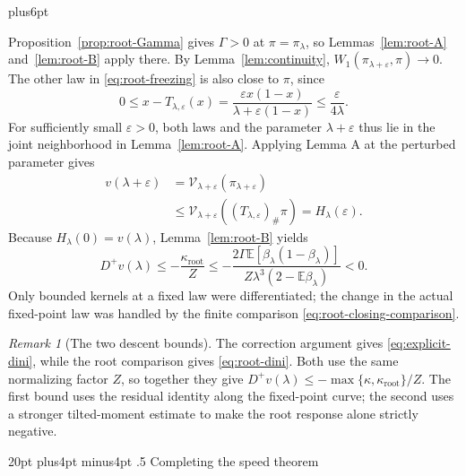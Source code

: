 \documentclass[11pt,reqno]{amsart}
\makeatletter
\def\section{\@startsection{section}{1}{0pt}%
  {20pt plus4pt minus4pt}
  {.5\linespacing}
  {\normalfont\bfseries}}
\theoremstyle{plain}
\theoremstyle{definition}
\theoremstyle{remark}
\newtheorem{remark}[theorem]{Remark}
\renewenvironment{proof}[1][\proofname]{%
  \par
  \pushQED{\qed}%
  \normalfont
  \topsep6pt plus6pt\relax
  \trivlist
  \item[\hskip\labelsep\slshape #1\@addpunct{.}]%
  \ignorespaces
}{%
  \popQED
  \endtrivlist
  \@endpefalse
}
\DeclareRobustCommand{\qed}{%
  \leavevmode\unskip\penalty9999\hbox{}\nobreak
  \ifmmode
    \makebox[0pt][l]{\qquad\hbox{\qedsymbol}}%
  \else
    \qquad\hbox{\qedsymbol}%
  \fi
}
\renewcommand{\qedsymbol}{\rule[.47pt]{4pt}{6pt}}
\numberwithin{equation}{section}
\newcommand{\E}{\mathbb E}
\newcommand{\Dplus}{D^{+}}
\makeatother
\begin{document}
\begin{proof}[Second proof of \eqref{eq:main-dini}]
Proposition~\ref{prop:root-Gamma} gives $\Gamma>0$ at
$\pi=\pi_\lambda$, so Lemmas~\ref{lem:root-A}
and~\ref{lem:root-B} apply there.
By Lemma~\ref{lem:continuity},
$W_1(\pi_{\lambda+\varepsilon},\pi)\to0$.
The other law in \eqref{eq:root-freezing} is also close to $\pi$, since
\[
 0\le x-T_{\lambda,\varepsilon}(x)
 =\frac{\varepsilon x(1-x)}{\lambda+\varepsilon(1-x)}
 \le\frac{\varepsilon}{4\lambda}.
\]
For sufficiently small $\varepsilon>0$, both laws and the parameter
$\lambda+\varepsilon$ thus lie in the joint neighborhood in
Lemma~\ref{lem:root-A}. Applying Lemma A at the
perturbed parameter gives
\begin{equation}\label{eq:root-closing-comparison}
 \begin{aligned}
 v(\lambda+\varepsilon)
 &=\mathcal V_{\lambda+\varepsilon}(\pi_{\lambda+\varepsilon})\\
 &\le\mathcal V_{\lambda+\varepsilon}
       ((T_{\lambda,\varepsilon})_\#\pi)
 =H_\lambda(\varepsilon).
 \end{aligned}
\end{equation}
Because $H_\lambda(0)=v(\lambda)$,
Lemma~\ref{lem:root-B} yields
\begin{equation}\label{eq:root-dini}
 \Dplus v(\lambda)
 \le-\frac{\kappa_{\mathrm{root}}}{Z}
 \le-\frac{2\Gamma\E[\beta_\lambda(1-\beta_\lambda)]}
             {Z\lambda^3(2-\E\beta_\lambda)}<0.
\end{equation}
Only bounded kernels at a fixed law were differentiated; the change in
the actual fixed-point law was handled by the finite comparison
\eqref{eq:root-closing-comparison}.
\end{proof}

\begin{remark}[The two descent bounds]\label{rem:root-two-bounds}
The correction argument gives \eqref{eq:explicit-dini}, while the root
comparison gives \eqref{eq:root-dini}. Both use the same normalizing
factor $Z$, so together they give
$\Dplus v(\lambda)\le-\max\{\kappa,\kappa_{\mathrm{root}}\}/Z$.
The first bound uses the residual identity along the fixed-point curve;
the second uses a stronger tilted-moment estimate to make the root
response alone strictly negative.
\end{remark}

\clearpage
\section{Completing the speed theorem}\label{sec:completion}
\end{document}
